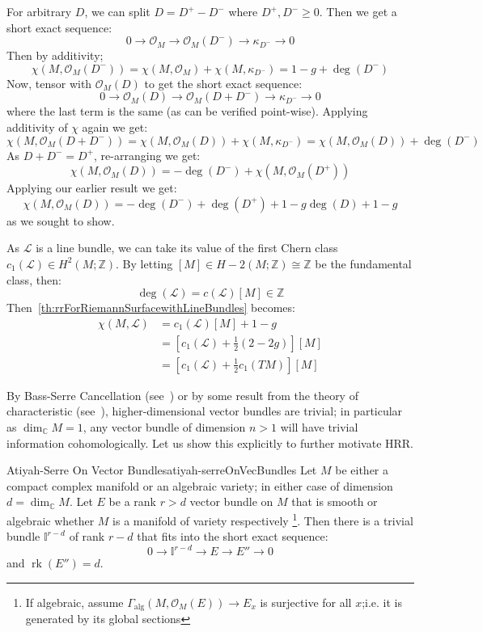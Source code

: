 \documentclass{ut-thesis}
\newenvironment{Proof}[1][]
  {\begin{ProofTcb}[#1]}
  {\end{ProofTcb}}
\newcommand{\Z}{{\mathbb{Z}}}
\newcommand{\BI}{{\mathbb{I}}}
\newcommand{\C}{{\mathbb{C}}}
\newcommand{\CL}{{\mathcal{L}}}
\newcommand{\CO}{{\mathcal{O}}}
\newcommand{\rk}{{\operatorname{rk}}}
\renewcommand{\deg}{{\operatorname{deg}}}
\begin{document}
\begin{Proof}
  For arbitrary $D$, we can split $D = D^+ - D^-$ where $D^+, D^- \ge 0$. Then we get a short exact sequence:
  \[
    0 \to \CO_M \to \CO_M(D^-) \to \kappa_{D^-} \to 0
  \]
  Then by additivity;
  \[
    \chi(M, \CO_M(D^-)) = \chi(M, \CO_M) +\chi(M, \kappa_{D^-}) = 1-g + \deg(D^-)
  \]
  Now, tensor with $\CO_M(D)$ to get the short exact sequence:
  \[
    0 \to \CO_M(D) \to \CO_M(D+D^-) \to \kappa_{D^-} \to 0
  \]
  where the last term is the same (as can be verified point-wise). Applying additivity of $\chi$ again we get:
  \[
    \chi(M, \CO_M(D+D^-)) = \chi(M, \CO_M(D)) + \chi(M, \kappa_{D^-}) = \chi(M, \CO_M(D)) + \deg(D^-)
  \]
  As $D + D^- = D^+$, re-arranging we get:
  \[
     \chi(M, \CO_M(D)) =  - \deg(D^-) + \chi(M, \CO_M(D^+))
  \]
  Applying our earlier result we get:
  \[
     \chi(M, \CO_M(D)) =  - \deg(D^-) + \deg(D^+) + 1-g  \deg(D) + 1-g
  \]
  as we sought to show.
\end{Proof}

As $\CL$ is a line bundle, we can take its value of the first Chern class $c_1(\CL) \in H^2(M; \Z)$. By
letting $[M] \in H-2(M; \Z) \cong \Z$ be the fundamental class, then:
\[
  \deg(\CL) = c(\CL)[M] \in \Z
\]
Then~\cref{th:rrForRiemannSurfacewithLineBundles} becomes:
\begin{align*}
  \chi(M, \CL) &= c_1(\CL)[M] + 1-g\\
               &= \left[c_1(\CL) + \frac{1}{2}(2-2g)\right][M]\\
               &= \left[c_1(\CL) + \frac{1}{2}c_1(TM)\right][M]
\end{align*}

By Bass-Serre Cancellation (see~\cite[section~5.1]{NateKTheory}) or by some result from the theory of
characteristic (see~\cite[section~3.2]{NateKTheory}), higher-dimensional vector bundles are trivial; in
particular as $\dim_\C M = 1$, any vector bundle of dimension $n > 1$ will have trivial information
cohomologically. Let us show this explicitly to further motivate HRR.


\begin{thm}{Atiyah-Serre On Vector Bundles}{atiyah-serreOnVecBundles}
  Let $M$ be either a compact complex manifold or an algebraic variety; in either case of dimension $d
  =\dim_\C M$. Let $E$ be a rank $r> d$ vector bundle on $M$ that is smooth or algebraic whether $M$ is a
  manifold of variety respectively \footnote{If algebraic, assume
    $\Gamma_{\operatorname{alg}}(M, \CO_M(E)) \to E_x$ is
  surjective for all $x$;i.e. it is generated by its global sections}. Then there is a trivial bundle
  $\BI^{r-d}$ of rank $r-d$ that fits into the short exact sequence:
  \[
    0 \to \BI^{r-d} \to E \to E'' \to 0
  \]
  and $\rk(E'') = d$.
\end{thm}
\end{document}
